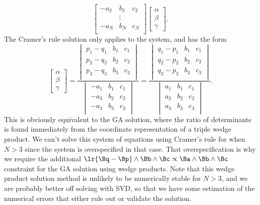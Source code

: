 {\begin{equation}
\begin{bmatrix}
-a_2 & b_2 & c_2 \\
     & \vdots & \\
-a_N & b_N & c_N \\
\end{bmatrix}
\begin{bmatrix}
\alpha \\
\beta \\
\gamma
\end{bmatrix}.
\end{equation}
The Cramer's rule solution only applies to the  system, and has the form
\begin{equation}\label{eqn:solutionOfLinearSystem:1460}
\begin{bmatrix}
\alpha \\
\beta \\
\gamma
\end{bmatrix}
=
\frac{
\begin{vmatrix}
p_1 - q_1 & b_1 & c_1 \\
p_2 - q_2 & b_2 & c_2 \\
p_3 - q_3 & b_3 & c_3 \\
\end{vmatrix}
}
{
\begin{vmatrix}
-a_1 & b_1 & c_1 \\
-a_2 & b_2 & c_2 \\
-a_3 & b_3 & c_3 \\
\end{vmatrix}
}
=
\frac{
\begin{vmatrix}
q_1 - p_1 & b_1 & c_1 \\
q_2 - p_2 & b_2 & c_2 \\
q_3 - p_3 & b_3 & c_3 \\
\end{vmatrix}
}
{
\begin{vmatrix}
a_1 & b_1 & c_1 \\
a_2 & b_2 & c_2 \\
a_3 & b_3 & c_3 \\
\end{vmatrix}
}.
\end{equation}
This is obviously equivalent to the GA solution, where the ratio of determinants is found immediately from the coordinate representation of a triple wedge product.  We can't solve this system of equations using Cramer's rule for  when \( N > 3 \) since the system is overspecified in that case.  That overspecification is why we require the additional
\( \lr{ \Bq - \Bp } \wedge \Bb \wedge \Bc \propto \Ba \wedge \Bb \wedge \Bc \)
constraint for the GA solution using wedge products.  Note that this wedge product solution method is unlikely to be numerically stable for \( N > 3 \), and we are probably better off solving with SVD, so that we have some estimation of the numerical errors that either rule out or validate the solution.
} %
